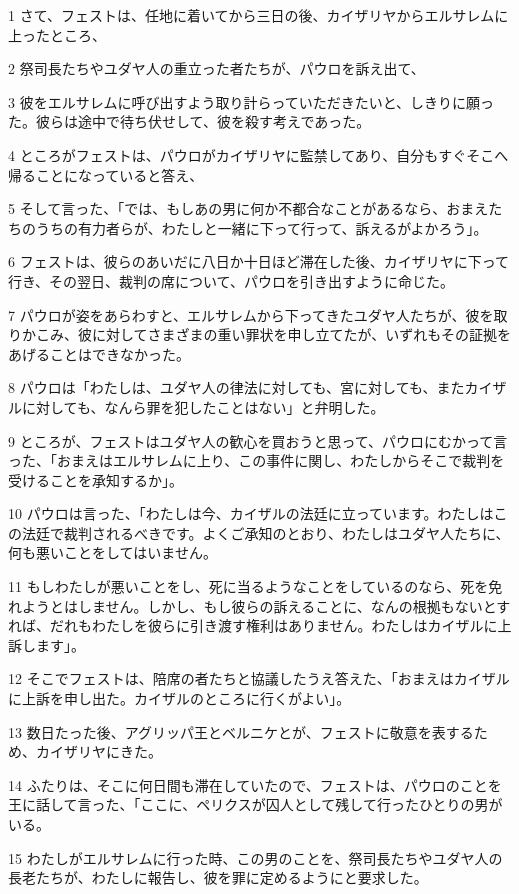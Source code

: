 \par 1 さて、フェストは、任地に着いてから三日の後、カイザリヤからエルサレムに上ったところ、
\par 2 祭司長たちやユダヤ人の重立った者たちが、パウロを訴え出て、
\par 3 彼をエルサレムに呼び出すよう取り計らっていただきたいと、しきりに願った。彼らは途中で待ち伏せして、彼を殺す考えであった。
\par 4 ところがフェストは、パウロがカイザリヤに監禁してあり、自分もすぐそこへ帰ることになっていると答え、
\par 5 そして言った、「では、もしあの男に何か不都合なことがあるなら、おまえたちのうちの有力者らが、わたしと一緒に下って行って、訴えるがよかろう」。
\par 6 フェストは、彼らのあいだに八日か十日ほど滞在した後、カイザリヤに下って行き、その翌日、裁判の席について、パウロを引き出すように命じた。
\par 7 パウロが姿をあらわすと、エルサレムから下ってきたユダヤ人たちが、彼を取りかこみ、彼に対してさまざまの重い罪状を申し立てたが、いずれもその証拠をあげることはできなかった。
\par 8 パウロは「わたしは、ユダヤ人の律法に対しても、宮に対しても、またカイザルに対しても、なんら罪を犯したことはない」と弁明した。
\par 9 ところが、フェストはユダヤ人の歓心を買おうと思って、パウロにむかって言った、「おまえはエルサレムに上り、この事件に関し、わたしからそこで裁判を受けることを承知するか」。
\par 10 パウロは言った、「わたしは今、カイザルの法廷に立っています。わたしはこの法廷で裁判されるべきです。よくご承知のとおり、わたしはユダヤ人たちに、何も悪いことをしてはいません。
\par 11 もしわたしが悪いことをし、死に当るようなことをしているのなら、死を免れようとはしません。しかし、もし彼らの訴えることに、なんの根拠もないとすれば、だれもわたしを彼らに引き渡す権利はありません。わたしはカイザルに上訴します」。
\par 12 そこでフェストは、陪席の者たちと協議したうえ答えた、「おまえはカイザルに上訴を申し出た。カイザルのところに行くがよい」。
\par 13 数日たった後、アグリッパ王とベルニケとが、フェストに敬意を表するため、カイザリヤにきた。
\par 14 ふたりは、そこに何日間も滞在していたので、フェストは、パウロのことを王に話して言った、「ここに、ペリクスが囚人として残して行ったひとりの男がいる。
\par 15 わたしがエルサレムに行った時、この男のことを、祭司長たちやユダヤ人の長老たちが、わたしに報告し、彼を罪に定めるようにと要求した。
